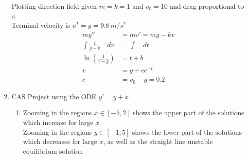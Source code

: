 \begin{enumerate}
          Plotting direction field given $m = k = 1$ and $v_{0} = 10$ and drag proportional to $v$. \\
          Terminal velocity is $v^{T} = g = 9.8\ m/s^{2}$
          \begin{align}
              my''                             & = mv' = mg - kv   \\
              \int \frac{1}{g - v}\quad dv     & = \int \quad dt   \\
              \ln \left(\frac{1}{v - g}\right) & = t + b           \\
              v                                & = g + c e^{-t}    \\
              c                                & = v_{0} - g = 0.2
          \end{align}

          \begin{figure}[H]
              \centering
          \end{figure}

    \item CAS Project using the ODE $y' = y + x$
          \begin{enumerate}
              \item Zooming in the regions $x \in [-5, 2]$ shows the upper part of the solutions which increase for large $x$ \\
                    Zooming in the regions $y \in [-1, 5]$ shows the lower part of the solutions which decreases for large $x$, as well as the straight line unstable equilibrium solution


\end{enumerate}
\end{enumerate}
